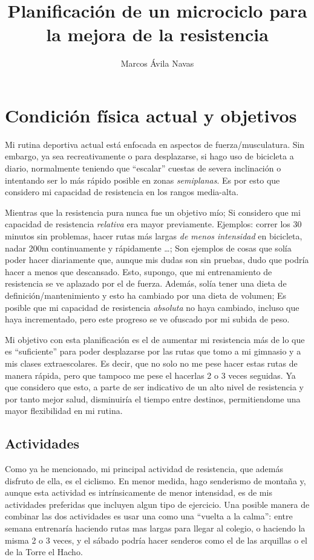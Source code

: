 \documentclass{article}
\title{Planificación de un microciclo para la mejora de la resistencia}
\author{Marcos Ávila Navas}
\date{\date{}}
\begin{document}
\maketitle

\section{Condición física actual y objetivos}

Mi rutina deportiva actual está enfocada en aspectos de fuerza/musculatura. Sin embargo, ya sea recreativamente o para desplazarse, si hago uso de bicicleta a diario, normalmente 
teniendo que ``escalar'' cuestas de severa inclinación o intentando ser lo más rápido posible en zonas \textit{semiplanas}. Es por esto que considero mi capacidad de resistencia 
en los rangos media-alta.

Mientras que la resistencia pura nunca fue un objetivo mío; Si considero que mi capacidad de resistencia \textit{relativa} era mayor previamente. 
Ejemplos: correr los 30 minutos sin problemas, hacer rutas más largas \textit{de menos intensidad} en bicicleta, nadar 200m continuamente y rápidamente \dots; 
Son ejemplos de cosas que solía poder hacer diariamente que, aunque mis dudas son sin pruebas, dudo que podría hacer a menos que descansado. Esto, supongo, que mi entrenamiento 
de resistencia se ve aplazado por el de fuerza. Además, solía tener una dieta de definición/mantenimiento y esto ha cambiado por una dieta de volumen; Es posible que mi capacidad 
de resistencia \textit{absoluta} no haya cambiado, incluso que haya incrementado, pero este progreso se ve ofuscado por mi subida de peso.

Mi objetivo con esta planificación es el de aumentar mi resistencia más de lo que es ``suficiente'' para poder desplazarse por las rutas que tomo a mi gimnasio y a mis clases 
extraescolares. Es decir, que no solo no me pese hacer estas rutas de manera rápida, pero que tampoco me pese el hacerlas 2 o 3 veces seguidas. Ya que considero que esto, 
a parte de ser indicativo de un alto nivel de resistencia y por tanto mejor salud, disminuiría el tiempo entre destinos, permitiendome una mayor flexibilidad en mi rutina.

\subsection{Actividades}

Como ya he mencionado, mi principal actividad de resistencia, que además disfruto de ella, es el ciclismo. En menor medida, hago senderismo de montaña y, aunque esta actividad es 
intrínsicamente de menor intensidad, es de mis actividades preferidas que incluyen algun tipo de ejercicio. Una posible manera de combinar las dos actividades es usar una como una 
``vuelta a la calma'': entre semana entrenaría haciendo rutas mas largas para llegar al colegio, o haciendo la misma 2 o 3 veces, y el sábado podría hacer senderos como el de 
las arquillas o el de la Torre el Hacho.
\end{document}
